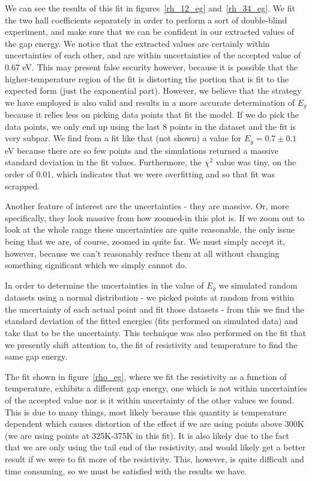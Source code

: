 \documentclass[reprint, nobibnotes, amssymb, amsmath, amsfonts, physics, mathtools, mathrsfs, floatfix]{revtex4-1}
\begin{document}
    We can see the results of this fit in figures~\ref{rh_12_eg} and~\ref{rh_34_eg}.  We fit the two hall coefficients separately in order to perform a sort of double-blind experiment, and make sure that we can be confident in our extracted values of the gap energy.  We notice that the extracted values are certainly within uncertainties of each other, and are within uncertainties of the accepted value of 0.67 eV.  This may present false security however, because it is possible that the higher-temperature region of the fit is distorting the portion that is fit to the expected form (just the exponential part).  However, we believe that the strategy we have employed is also valid and results in a more accurate determination of $E_g$ because it relies less on picking data points that fit the model.  If we do pick the data points, we only end up using the last 8 points in the dataset and the fit is very subpar.  We find from a fit like that (not shown) a value for $E_g = 0.7 \pm 0.1$ eV because there are so few points and the simulations returned a massive standard deviation in the fit values.  Furthermore, the $\chi^2$ value was tiny, on the order of 0.01, which indicates that we were overfitting and so that fit was scrapped.

    Another feature of interest are the uncertainties - they are massive.  Or, more specifically, they look massive from how zoomed-in this plot is.  If we zoom out to look at the whole range these uncertainties are quite reasonable, the only issue being that we are, of course, zoomed in quite far.  We must simply accept it, however, because we can't reasonably reduce them at all without changing something significant which we simply cannot do.

    In order to determine the uncertainties in the value of $E_g$ we simulated random datasets using a normal distribution - we picked points at random from within the uncertainty of each actual point and fit those datasets - from this we find the standard deviation of the fitted energies (fits performed on simulated data) and take that to be the uncertainty.  This technique was also performed on the fit that we presently shift attention to, the fit of resistivity and temperature to find the same gap energy.

    The fit shown in figure~\ref{rho_eg}, where we fit the resistivity as a function of temperature, exhibits a different gap energy, one which is not within uncertainties of the accepted value nor is it within uncertainty of the other values we found.  This is due to many things, most likely because this quantity is temperature dependent which causes distortion of the effect if we are using points above 300K (we are using points at 325K-375K in this fit).  It is also likely due to the fact that we are only using the tail end of the resistivity, and would likely get a better result if we were to fit more of the resistivity.  This, however, is quite difficult and time consuming, so we must be satisfied with the results we have.
\end{document}
